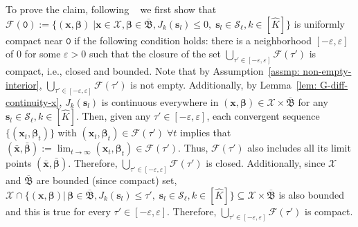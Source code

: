 \documentclass[opre,sglanonrev]{informs4}
\newcommand{\mF}{\mathcal{F}}
\newcommand{\mS}{\mathcal{S}}
\newcommand{\mX}{\mathcal{X}}
\newcommand{\mfB}{\mathfrak{B}}
\newcommand{\bbeta}{\bm{\beta}}
\newcommand{\bs}{\bm{s}}
\newcommand{\bx}{\bm{x}}
\begin{document}
{\begin{APPENDICES}
     To prove the claim, following ~\cite[Definition~1.3]{gauvin1977differential} we first show that $\mF(\mathtt{0}) := \{ (\bx, \bbeta) \; | \bx \in \mX, \bbeta \in \overline{\mfB}, J_k(\bs_l)\le 0,\;\bs_l \in \mS_\ell, k \in [\hat{K}]\}$ is uniformly compact near $\mathtt{0}$ if the following condition holds: there is a neighborhood $[- \varepsilon, \varepsilon]$ of $0$ for some $\varepsilon > 0$ such that the closure of the set $\bigcup_{\tau' \in [- \varepsilon, \varepsilon]} \mF(\tau')$ is compact, i.e., closed and bounded. Note that by Assumption~\ref{assmp: non-empty-interior}, $\bigcup_{\tau' \in [-\varepsilon, \varepsilon]} \mF(\tau')$ is not empty. Additionally, by Lemma~\ref{lem: G-diff-continuity-x}, $J_k(\bs_l)$ is continuous everywhere in $(\bx, \bbeta) \in \mX \times \overline{\mfB}$ for any $\bs_l \in \mS_\ell, k \in [\hat{K}]$. Then,
given any $\tau' \in [-\varepsilon, \varepsilon]$, each convergent sequence  $\{(\bx_t, \bbeta_t)\}$ with $(\bx_t, \bbeta_t) \in \mF(\tau') \; \forall t$ implies that $(\bar{\bx}, \bar{\bbeta}) := \lim_{t \to \infty} (\bx_t, \bbeta_t) \in \mF(\tau')$.  
Thus, $\mF(\tau')$ also includes all its limit points $(\bar{\bx}, \bar{\bbeta}) $. Therefore, $\bigcup_{\tau' \in [-\varepsilon, \varepsilon]} \mF(\tau')$ is closed. Additionally, since $\mX$ and $\overline{\mfB}$ are bounded (since compact) set, $\mX \cap \{ (\bx, \bbeta) | \, \bbeta \in \overline{\mfB}, J_k(\bs_l) \le \tau',\;\bs_l \in \mS_\ell, k \in [\hat{K}]\} \subseteq \mX \times \overline{\mfB}$ is also bounded and this is true for every $\tau' \in [-\varepsilon, \varepsilon]$. Therefore,  $\bigcup_{\tau' \in [-\varepsilon, \varepsilon]} \mF(\tau')$ is compact.


\end{APPENDICES}}
\end{document}
